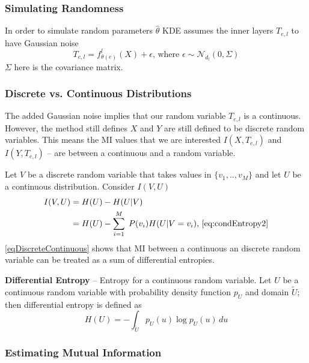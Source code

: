 \documentclass[dissertation.tex]{subfiles}
\begin{document}
\subsubsection{Simulating Randomness}

In order to simulate random parameters $\hat{\theta}$ KDE assumes the inner
layers $T_{e,l}$ to have Gaussian noise
\begin{equation}
  T_{e,l} = f_{\theta(e)}^l(X) + \epsilon
  \text{, where }\epsilon\sim\mathcal{N}_{d_l}(0,\Sigma)
  \label{eqTwithNoise}
\end{equation}
$\Sigma$ here is the covariance matrix. 

\subsubsection{Discrete vs. Continuous Distributions}

The added Gaussian noise implies that our random variable $T_{e,l}$ is a
continuous. However, the method still defines $X$ and $Y$ are still defined to
be discrete random variables. This means the MI values that we are interested
$I(X,T_{e,l})$ and $I(Y,T_{e,l})$ -- are between a continuous and a random
variable.

Let $V$ be a discrete random variable that takes values in $\{v_1,..,v_M\}$ and
let $U$ be a continuous distribution. Consider $I(V, U)$ 
\begin{align}
  I(V, U)&=H(U)-H(U|V) \nonumber\\&=
  H(U)-\sum_{i=1}^M\;P(v_i)H(U|V=v_i)
  \text{, \autoref{eq:condEntropy2}}
  \label{eqDiscreteContinuous}
\end{align}
\autoref{eqDiscreteContinuous} 
shows that MI between a continuous an discrete random variable can be treated as
a sum of differential entropies.

\textbf{Differential Entropy} -- Entropy for a continuous random variable. Let
$U$ be a continuous random variable with probability density function $p_U$ and
domain $\tilde{U}$; then differential entropy is defined as
\begin{equation}
  H(U)=-\int _{\tilde{U}}p_U(u)\log p_U(u)\,du
\end{equation}

\subsubsection{Estimating Mutual Information}
\end{document}
